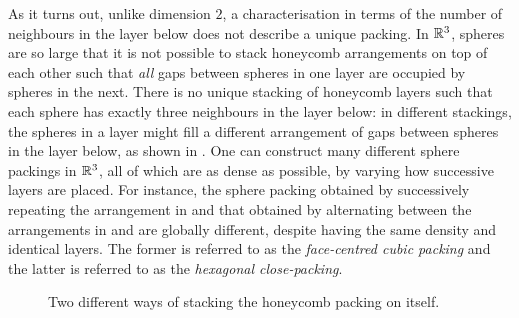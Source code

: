 As it turns out, unlike dimension $2$, a characterisation in terms of the number of neighbours in the layer below does not describe a unique packing. In $\mathbb{R}^3$, spheres are so large that it is not possible to stack honeycomb arrangements on top of each other such that \textit{all} gaps between spheres in one layer are occupied by spheres in the next. There is no unique stacking of honeycomb layers such that each sphere has exactly three neighbours in the layer below: in different stackings, the spheres in a layer might fill a different arrangement of gaps between spheres in the layer below, as shown in . One can construct many different sphere packings in $\mathbb{R}^3$, all of which are as dense as possible, by varying how successive layers are placed. For instance, the sphere packing obtained by successively repeating the arrangement in  and that obtained by alternating between the arrangements in  and  are globally different, despite having the same density and identical layers. The former is referred to as the \textit{face-centred cubic packing} and the latter is referred to as the \textit{hexagonal close-packing}.

\begin{figure}[htb]
    \centering
    \begin{subfigure}{0.48\linewidth}
        \centering
        \subcaption{}
        \label{Ch1:Subfig:3D_Triangular_Stacking}
    \end{subfigure}
    \begin{subfigure}{0.48\linewidth}
        \centering
        \subcaption{}
        \label{Ch1:Subfig:3D_Hexagonal_Stacking}
    \end{subfigure}
    \caption{Two different ways of stacking the honeycomb packing on itself.}
    \label{Ch1:Fig:2_Optimal_3D_Packings}
\end{figure}